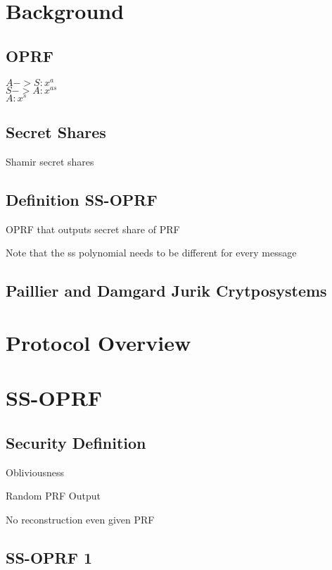 \documentclass[10pt, sigconf]{acmart}
\begin{document}
\section{Background}

\subsection{OPRF}

$A -> S: x^a$ \\
$S -> A: x^{as}$ \\
$A: x^s$

\subsection{Secret Shares}

Shamir secret shares

\subsection{Definition SS-OPRF}

OPRF that outputs secret share of PRF

Note that the ss polynomial needs to be different for every message

\subsection{Paillier and Damgard Jurik Crytposystems}

\section{Protocol Overview}


\section{SS-OPRF}

\subsection{Security Definition}

Obliviousness

Random PRF Output

No reconstruction even given PRF

\subsection{SS-OPRF 1}
\end{document}
